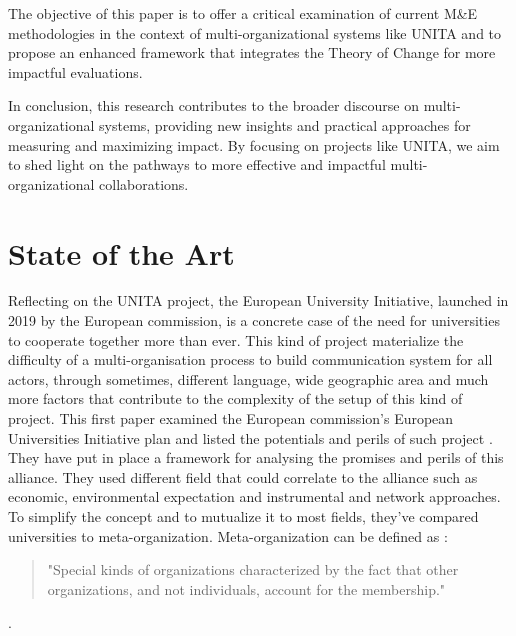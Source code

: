 \documentclass[conference]{IEEEtran}
\begin{document}
The objective of this paper is to offer a critical examination of current M\&E methodologies in the context of multi-organizational systems like UNITA and to propose an enhanced framework that integrates the Theory of Change for more impactful evaluations.

In conclusion, this research contributes to the broader discourse on multi-organizational systems, providing new insights and practical approaches for measuring and maximizing impact. By focusing on projects like UNITA, we aim to shed light on the pathways to more effective and impactful multi-organizational collaborations.

\section{State of the Art}
\label{soa}
Reflecting on the UNITA project, the European University Initiative, launched in 2019 by the European commission, is a concrete case of the need for universities to cooperate together more than ever. This kind of project materialize the difficulty of a multi-organisation process to build communication system for all actors, through sometimes, different language, wide geographic area and much more factors that contribute to the complexity of the setup of this kind of project.\cite{european_commision_european_2019}
This first paper examined the European commission's European Universities Initiative plan \cite{european_commision_european_2019} and listed the potentials and perils of such project \cite{maassen_european_2023}. They have put in place a framework for analysing the promises and perils of this alliance. They used different field that could correlate to the alliance such as economic, environmental expectation and instrumental and network approaches.\cite{maassen_european_2023} To simplify the concept and to mutualize it to most fields, they've compared universities to meta-organization. \cite{maassen_european_2023} Meta-organization can be defined as :
\begin{quote}
    "Special kinds of organizations characterized by the fact that other organizations, and not individuals, account for the membership."
\end{quote}\cite{maassen_european_2023,gulati_meta-organization_2012,berkowitz_concept_2016,ahrne_meta-organizations_2008}.
\end{document}
